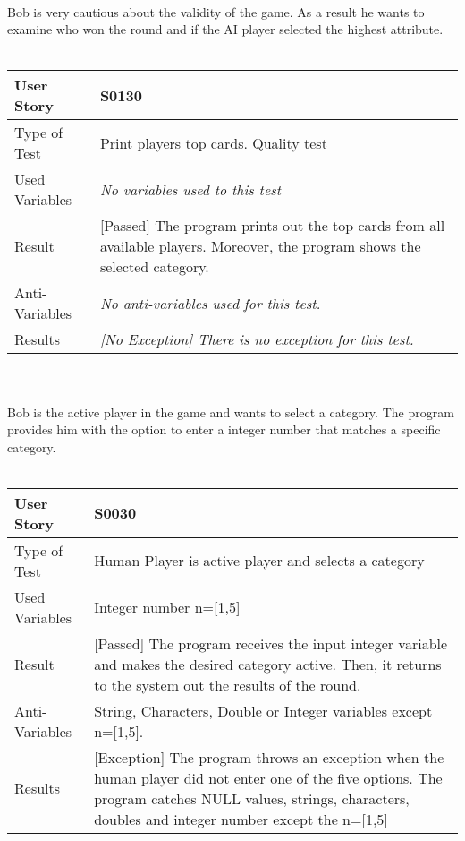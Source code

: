 \vspace{0.2cm}\\
Bob is very cautious about the validity of the game. As a result he wants to examine who won the round and if the AI player selected the highest attribute.\\
\vspace{0.2cm}\\
\begin{tabular}{l | p{12cm}}
User Story & \textbf{S0130} \\ \hline
Type of Test & Print players top cards. Quality test \\ \hline
Used Variables & \textit{No variables used to this test}\\ \hline
Result & [Passed] The program prints out the top cards from all available players. Moreover, the program shows the selected category.\\ \hline
Anti-Variables & \textit{No anti-variables used for this test.}\\ \hline
Results & \textit{[No Exception] There is no exception for this test.}\\ \hline
\end{tabular}\\
\vspace{0.2cm}\\
Bob is the active player in the game and wants to select a category. The program provides him with the option to enter a integer number that matches a specific category.\\
\vspace{0.2cm}\\
\begin{tabular}{l | p{12cm}}
User Story & \textbf{S0030}\\ \hline
Type of Test & Human Player is active player and selects a category\\ \hline
Used Variables & Integer number n=[1,5]\\ \hline
Result & [Passed] The program receives the input integer variable and makes the desired category active. Then, it returns to the system out the results of the round.\\ \hline
Anti-Variables & String, Characters, Double or Integer variables except n=[1,5].\\ \hline
Results & [Exception] The program throws an exception when the human player did not enter one of the five options. The program catches NULL values, strings, characters, doubles and integer number except the n=[1,5]\\ \hline
\end{tabular}\\
